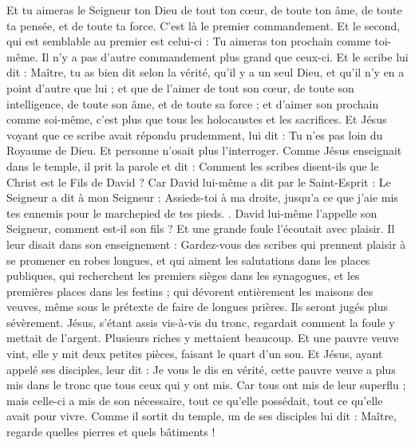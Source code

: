 \begin{multicols}{2}
Et tu aimeras le Seigneur ton Dieu de tout ton cœur, de toute ton âme, de toute ta pensée, et de toute ta force. C'est là le premier commandement.
Et le second, qui est semblable au premier est celui-ci : Tu aimeras ton prochain comme toi-même. Il n'y a pas d'autre commandement plus grand que ceux-ci.
Et le scribe lui dit : Maître, tu as bien dit selon la vérité, qu'il y a un seul Dieu, et qu'il n'y en a point d'autre que lui ;
et que de l'aimer de tout son cœur, de toute son intelligence, de toute son âme, et de toute sa force ; et d'aimer son prochain comme soi-même, c'est plus que tous les holocaustes et les sacrifices.
Et Jésus voyant que ce scribe avait répondu prudemment, lui dit : Tu n'es pas loin du Royaume de Dieu. Et personne n'osait plus l'interroger.
Comme Jésus enseignait dans le temple, il prit la parole et dit : Comment les scribes disent-ils que le Christ est le Fils de David ?
Car David lui-même a dit par le Saint-Esprit : Le Seigneur a dit à mon Seigneur : Assieds-toi à ma droite, jusqu’a ce que j’aie mis tes ennemis pour le marchepied de tes pieds.
.
David lui-même l'appelle son Seigneur, comment est-il son fils ? Et une grande foule l’écoutait avec plaisir.
Il leur disait dans son enseignement : Gardez-vous des scribes qui prennent plaisir à se promener en robes longues, et qui aiment les salutations dans les places publiques,
qui recherchent les premiers sièges dans les synagogues, et les premières places dans les festins ;
qui dévorent entièrement les maisons des veuves, même sous le prétexte de faire de longues prières. Ils seront jugés plus sévèrement.
Jésus, s’étant assis vis-à-vis du tronc, regardait comment la foule y mettait de l'argent. Plusieurs riches y mettaient beaucoup.
Et une pauvre veuve vint, elle y mit deux petites pièces, faisant le quart d’un sou.
Et Jésus, ayant appelé ses disciples, leur dit : Je vous le dis en vérité, cette pauvre veuve a plus mis dans le tronc que tous ceux qui y ont mis.
Car tous ont mis de leur superflu ; mais celle-ci a mis de son nécessaire, tout ce qu'elle possédait, tout ce qu’elle avait pour vivre.
\VerseOne{}Comme il sortit du temple, un de ses disciples lui dit : Maître, regarde quelles pierres et quels bâtiments !

\end{multicols}

